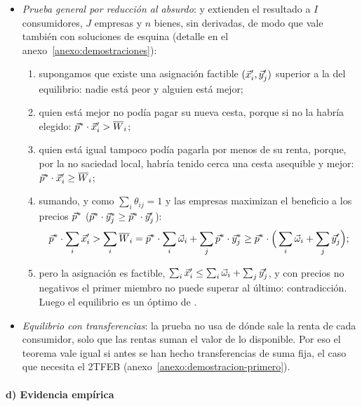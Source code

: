 \documentclass[11pt]{article}
\begin{document}
\begin{itemize}
\item \emph{Prueba general por reducción al absurdo}\nocite{MasColellWhinstonGreen1995}:  y  extienden el resultado a $I$ consumidores, $J$ empresas y $n$ bienes, sin derivadas, de modo que vale también con soluciones de esquina (detalle en el anexo~\ref{anexo:demostraciones}):
  \begin{enumerate}
  \item supongamos que existe una asignación factible $(\vec{x}'_i,\vec{y}'_j)$  superior a la del equilibrio: nadie está peor y alguien está mejor;
  \item quien está mejor no podía pagar su nueva cesta, porque si no la habría elegido: $\vec{p}^*\cdot\vec{x}'_i>\overline{W}_i$;
  \item quien está igual tampoco podía pagarla por menos de su renta, porque, por la no saciedad local, habría tenido cerca una cesta asequible y mejor: $\vec{p}^*\cdot\vec{x}'_i\geq\overline{W}_i$;
  \item sumando, y como $\sum_i\theta_{ij}=1$ y las empresas maximizan el beneficio a los precios $\vec{p}^*$ ($\vec{p}^*\cdot\vec{y}^*_j\geq\vec{p}^*\cdot\vec{y}'_j$):
  $$\vec{p}^*\cdot\sum_i\vec{x}'_i>\sum_i\overline{W}_i=\vec{p}^*\cdot\sum_i\vec{\omega}_i+\sum_j\vec{p}^*\cdot\vec{y}^*_j\geq\vec{p}^*\cdot\Big(\sum_i\vec{\omega}_i+\sum_j\vec{y}'_j\Big);$$
  \item pero la asignación es factible, $\sum_i\vec{x}'_i\leq\sum_i\vec{\omega}_i+\sum_j\vec{y}'_j$, y con precios no negativos el primer miembro no puede superar al último: contradicción. Luego el equilibrio es un óptimo de .\findemo
  \end{enumerate}
\item \emph{Equilibrio con transferencias}: la prueba no usa de dónde sale la renta de cada consumidor, solo que las rentas suman el valor de lo disponible. Por eso el teorema vale igual si antes se han hecho transferencias de suma fija, el caso que necesita el 2TFEB (anexo~\ref{anexo:demostracion-primero}).
\end{itemize}

\paragraph{d) Evidencia empírica}
\end{document}
